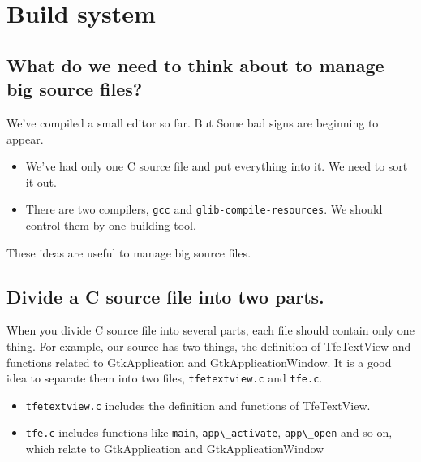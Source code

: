 \hypertarget{build-system}{%
\section{Build system}\label{build-system}}

\hypertarget{what-do-we-need-to-think-about-to-manage-big-source-files}{%
\subsection{What do we need to think about to manage big source
files?}\label{what-do-we-need-to-think-about-to-manage-big-source-files}}

We've compiled a small editor so far. But Some bad signs are beginning
to appear.

\begin{itemize}
\tightlist
\item
  We've had only one C source file and put everything into it. We need
  to sort it out.
\item
  There are two compilers, \passthrough{\lstinline!gcc!} and
  \passthrough{\lstinline!glib-compile-resources!}. We should control
  them by one building tool.
\end{itemize}

These ideas are useful to manage big source files.

\hypertarget{divide-a-c-source-file-into-two-parts.}{%
\subsection{Divide a C source file into two
parts.}\label{divide-a-c-source-file-into-two-parts.}}

When you divide C source file into several parts, each file should
contain only one thing. For example, our source has two things, the
definition of TfeTextView and functions related to GtkApplication and
GtkApplicationWindow. It is a good idea to separate them into two files,
\passthrough{\lstinline!tfetextview.c!} and
\passthrough{\lstinline!tfe.c!}.

\begin{itemize}
\tightlist
\item
  \passthrough{\lstinline!tfetextview.c!} includes the definition and
  functions of TfeTextView.
\item
  \passthrough{\lstinline!tfe.c!} includes functions like
  \passthrough{\lstinline!main!},
  \passthrough{\lstinline!app\_activate!},
  \passthrough{\lstinline!app\_open!} and so on, which relate to
  GtkApplication and GtkApplicationWindow
\end{itemize}

